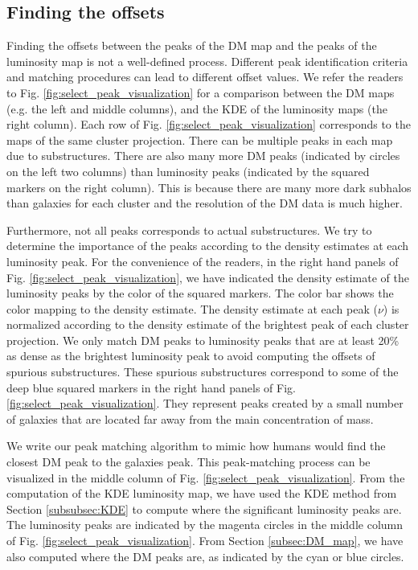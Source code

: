 \subsection{Finding the offsets} \label{subsec:offsets}
Finding the offsets between the peaks of the DM map and the peaks of the 
luminosity map is not a well-defined process. Different peak identification
criteria and matching
procedures can lead to different offset values. 
We refer the readers to Fig. \ref{fig:select_peak_visualization} for a comparison
between the DM maps (e.g. the left and middle columns), and 
the KDE of the luminosity maps (the right column).
Each row of Fig. \ref{fig:select_peak_visualization} corresponds to the maps of
the same cluster projection.
There can be multiple peaks in each map due to substructures. 
There are also many more DM peaks (indicated by circles on the left two columns) 
than luminosity peaks (indicated by the squared markers on the right column).
This is because there are many more dark subhalos than galaxies for each cluster and 
the resolution of the DM data is much higher. 

Furthermore, not all peaks corresponds to actual substructures.
We try to determine the importance of the peaks according to the density 
estimates at each luminosity peak. For the convenience of the readers, 
in the right hand panels of Fig. \ref{fig:select_peak_visualization},
we have indicated the density estimate of the luminosity peaks 
by the color of the squared markers. 
The color bar shows the color mapping to the density estimate.
The density estimate at each peak ($\nu$) is normalized according to the density
estimate of the brightest peak of each cluster projection. 
We only match DM peaks to luminosity 
peaks that are at least 20\% as dense as the brightest luminosity peak to avoid 
computing the offsets of spurious substructures.
These spurious substructures correspond to some of 
the deep blue squared markers in the right hand panels of Fig.
\ref{fig:select_peak_visualization}.
They represent peaks created by a small number of galaxies that
are located far away from the main concentration of mass.

We write our peak matching algorithm to mimic how humans would
find the closest DM peak to the galaxies peak. 
This peak-matching process can be visualized in the middle column of 
Fig. \ref{fig:select_peak_visualization}.
From the computation of the KDE luminosity map,
we have used the KDE method from Section \ref{subsubsec:KDE} to compute 
where the significant luminosity peaks are. 
The luminosity peaks are indicated by the magenta circles in the middle column
of Fig. \ref{fig:select_peak_visualization}.
From Section \ref{subsec:DM_map}, we have also computed where the DM peaks are, 
as indicated by the cyan or blue circles.


